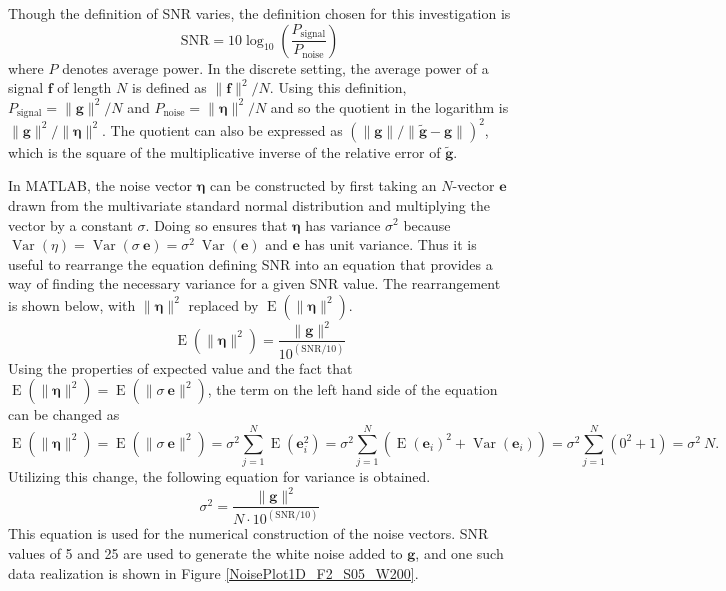 \documentclass[12pt,notitlepage]{report}
\newcommand{\gVec}{\mathbf{g}}	%
\newcommand{\gnoiseVec}{\widetilde{\mathbf{g}}}	%
\newcommand{\noise}{\eta}	%
\newcommand{\noiseSD}{\sigma}	%
\newcommand{\noiseVec}{\bm{\noise}}	%
\DeclareMathOperator{\Var}{Var}	%
\DeclareMathOperator{\E}{E}	%
\begin{document}
Though the definition of SNR varies, the definition chosen for this investigation is
\begin{equation}
\label{eq:SNR}
\text{SNR} = 10\log_{10}\left(\frac{P_{\text{signal}}}{P_{\text{noise}}}\right)
\end{equation}
where $P$ denotes average power. In the discrete setting, the average power of a signal $\mathbf{f}$ of length $N$ is defined as $\|\mathbf{f}\|^2/N$. Using this definition, $P_{\text{signal}} = \|\gVec\|^2/N$ and $P_{\text{noise}} = \|\noiseVec\|^2/N$ and so the quotient in the logarithm is $\|\gVec\|^2/\|\noiseVec\|^2$. The quotient can also be expressed as $(\|\gVec\|/\|\gnoiseVec - \gVec\|)^2$, which is the square of the multiplicative inverse of the relative error of $\gnoiseVec$. \par
In MATLAB, the noise vector $\noiseVec$ can be constructed by first taking an $N$-vector $\mathbf{e}$ drawn from the multivariate standard normal distribution and multiplying the vector by a constant $\noiseSD$. Doing so ensures that $\noiseVec$ has variance $\noiseSD^2$ because $\Var(\noise) = \Var(\noiseSD\:\mathbf{e}) = \noiseSD^2\:\Var(\mathbf{e})$ and $\mathbf{e}$ has unit variance. Thus it is useful to rearrange the equation defining SNR into an equation that provides a way of finding the necessary variance for a given SNR value. The rearrangement is shown below, with $\|\noiseVec\|^2$ replaced by $\E(\|\noiseVec\|^2)$.
\[\E(\|\noiseVec\|^2) = \frac{\|\gVec\|^2}{10^{(\text{SNR}/10)}}\]
Using the properties of expected value and the fact that $\E(\|\noiseVec\|^2) = \E(\|\noiseSD\:\mathbf{e}\|^2)$, the term on the left hand side of the equation can be changed as
\[\E(\|\noiseVec\|^2) = \E(\|\noiseSD\:\mathbf{e}\|^2) = \noiseSD^2 \sum_{j=1}^N \E(\mathbf{e}_i^2) = \noiseSD^2 \sum_{j=1}^N \left(\E(\mathbf{e}_i)^2 + \Var(\mathbf{e}_i)\right) = \noiseSD^2 \sum_{j=1}^N \left(0^2 + 1\right) = \noiseSD^2\:N.\]
Utilizing this change, the following equation for variance is obtained.
\begin{equation}
\label{eq:Var}
\noiseSD^2 = \frac{\|\gVec\|^2}{N \cdot 10^{(\text{SNR}/10)}}
\end{equation}
This equation is used for the numerical construction of the noise vectors. SNR values of 5 and 25 are used to generate the white noise added to $\gVec$, and one such data realization is shown in Figure \ref{NoisePlot1D_F2_S05_W200}. \par
\end{document}
